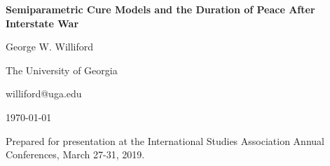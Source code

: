 \documentclass{article}
\begin{document}
	
	
	\begin{comment}
	$\ti$ = (ti)\\
	$\di$ = censoring indicator (di)\\
	$\yi$ = cure indicator (yi)\\
	$p$ = $\Pr(Y = 1)$\\
	\textbf{Covariates}\\
	$\xvec$ = vector of hazard/latency covariates\\
	$\zvec$ = vector of cure/incidence covariates\\
	$\xib$ = xib\\
	$\zig$ = zig\\
	$\exb$ 
	$\ezg$
	\textbf{Hazard functions}\\
	$\hu$ = Hazard function for uncured subjects (hu)\\
	$\ho$ = Baseline hazard function for uncured subjects (ho)\\
	$\hux$\\
	$\hox$\\	
	\textbf{Survivor Functions}\\
	$\spop$ = Population survivor function (spop)\\
	$\su$ = Survivor uncured covariates\\
	$\so$ = Baseline survivor uncured covariates\\
	$\sux$ = Survivor function for uncured subjects (sux)\\
	$\sox$ = Baseline survivor function for uncured subjects (sox)\\
	$\sohat$ = Estimated Baseline survivor function for uncured subjects (sohat) \\
	\textbf{Estimation Quantities}\\ 
	$\wi$\\
	\newpage
	\end{comment}
	
	\begin{center}
		\textbf{Semiparametric Cure Models and the Duration of Peace After Interstate War}%
		
		
		George W. Williford
		
		The University of Georgia
		
		williford@uga.edu
		
		\today
		
		\vspace{8cm}
		Prepared for presentation at the International Studies Association Annual Conferences, March 27-31, 2019.
		
		
	\end{center}
	
\end{document}

